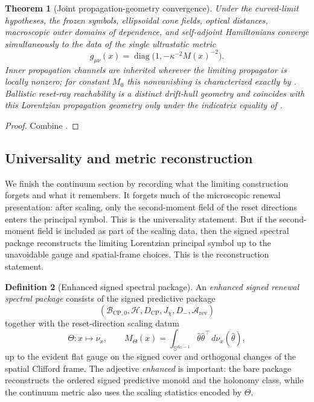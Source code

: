 \documentclass[11pt]{article}
\newtheorem{theorem}{Theorem}[section]
\theoremstyle{definition}
\newtheorem{definition}[theorem]{Definition}
\theoremstyle{remark}
\newcommand{\Arev}{\mathcal{A}_{\mathrm{rev}}}
\newcommand{\B}{\mathcal{B}}
\newcommand{\Hh}{\mathcal{H}}
\newcommand{\CP}{\mathrm{CP}}
\newcommand{\dCl}{d_{\mathrm{Cl}}}
\newcommand{\Sphere}{\mathbb{S}}
\newcommand{\diag}{\operatorname{diag}}
\begin{document}
\begin{theorem}[Joint propagation-geometry convergence]
\label{thm:joint-propagation}
Under the curved-limit hypotheses, the frozen symbols, ellipsoidal cone fields,
optical distances, macroscopic outer domains of dependence, and self-adjoint
Hamiltonians converge simultaneously to the data of the single ultrastatic
metric
\[
 g_{\mu\nu}(x)=\diag\bigl(1,-\kappa^{-2}M(x)^{-2}\bigr).
\]
Inner propagation channels are inherited wherever the limiting propagator is
locally nonzero; for constant \(M_0\) this nonvanishing is characterized exactly
by .
Ballistic reset-ray reachability is a distinct drift-hull geometry and coincides
with this Lorentzian propagation geometry only under the indicatrix equality of
.
\end{theorem}

\begin{proof}
Combine .
\end{proof}


\subsection{Universality and metric reconstruction}
\label{sec:universality-reconstruction}

We finish the continuum section by recording what the limiting construction
forgets and what it remembers.  It forgets much of the microscopic renewal
presentation: after scaling, only the second-moment field of the reset
directions enters the principal symbol.  This is the universality statement.
But if the second-moment field is included as part of the scaling data, then the
signed spectral package reconstructs the limiting Lorentzian principal symbol
up to the unavoidable gauge and spatial-frame choices.  This is the
reconstruction statement.

\begin{definition}[Enhanced signed spectral package]
\label{def:enhanced-package}
An \emph{enhanced signed renewal spectral package} consists of the signed
predictive package
\[
  (\B_{\CP,0},\Hh,D_{\CP},J_\chi,D_-,\Arev)
\]
together with the reset-direction scaling datum
\[
  \Theta:x\longmapsto \nu_x,
  \qquad
  M_\Theta(x)=\int_{\Sphere^{\dCl-1}}\hat\theta\hat\theta^{\top}
  \,d\nu_x(\hat\theta),
\]
up to the evident flat gauge on the signed cover and orthogonal changes of the
spatial Clifford frame.  The adjective \emph{enhanced} is important: the bare
package reconstructs the ordered signed predictive monoid and the holonomy
class, while the continuum metric also uses the scaling statistics encoded by
\(\Theta\).
\end{definition}
\end{document}

